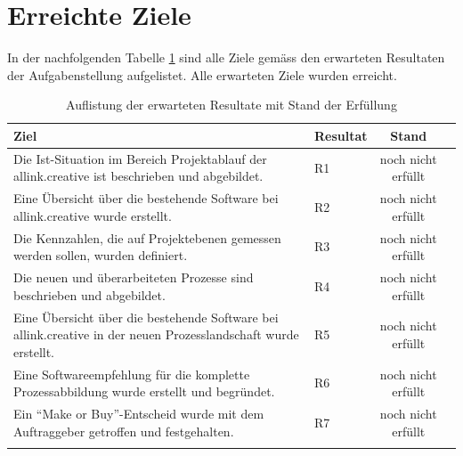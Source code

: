 \section{Erreichte Ziele}
In der nachfolgenden Tabelle \ref{tab:erreichte_ziele} sind alle Ziele gemäss 
den erwarteten Resultaten der Aufgabenstellung aufgelistet. Alle 
erwarteten Ziele wurden erreicht.

\begin{center}
    \begin{longtable}{p{8cm}lcl}
        \toprule \textbf{Ziel} & \textbf{Resultat} & \textbf{Stand} \\
        \midrule Die Ist-Situation im Bereich Projektablauf der allink.creative
            ist beschrieben und abgebildet. & R1 & noch nicht erfüllt \\
        \midrule Eine Übersicht über die bestehende Software bei allink.creative
            wurde erstellt. & R2 & noch nicht erfüllt \\
        \midrule Die Kennzahlen, die auf Projektebenen gemessen werden sollen,
            wurden definiert. & R3 & noch nicht erfüllt \\
        \midrule Die neuen und überarbeiteten Prozesse sind beschrieben und
            abgebildet. & R4 & noch nicht erfüllt \\
        \midrule Eine Übersicht über die bestehende Software bei allink.creative
            in der neuen Prozesslandschaft wurde erstellt. & R5 & noch nicht erfüllt \\
        \midrule Eine Softwareempfehlung für die komplette Prozessabbildung
            wurde erstellt und begründet. & R6 & noch nicht erfüllt \\
        \midrule Ein ``Make or Buy''-Entscheid wurde mit dem Auftraggeber 
            getroffen und festgehalten. & R7 & noch nicht erfüllt \\
        \bottomrule
        \caption{Auflistung der erwarteten Resultate mit Stand der Erfüllung}
        \label{tab:erreichte_ziele}
    \end{longtable}
\end{center}
